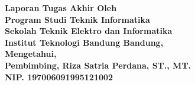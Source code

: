 \clearpage
\pagestyle{empty}

\begin{center}
\smallskip
    \Large \bfseries \MakeUppercase{\thetitle}
    \vfill
    \Large Laporan Tugas Akhir
    \vfill
    \large Oleh
    \Large \uppercase{\theauthor} \\
    \large Program Studi Teknik Informatika \\ Sekolah Teknik Elektro dan Informatika \\ Institut Teknologi Bandung
    \vfill
    \normalsize \normalfont
    \vfill
    Bandung, \thedate \\
    Mengetahui, \\
    Pembimbing,
    \vfill
    \vfill
    Riza Satria Perdana, ST., MT. \\
    NIP. 197006091995121002
\end{center}
\clearpage
